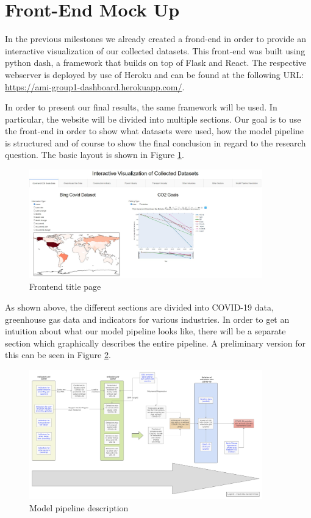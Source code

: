 \section{Front-End Mock Up}

In the previous milestones we already created a frond-end in order to provide an interactive visualization of our collected datasets. This front-end was built using python dash, a framework that builds on top of Flask and React. The respective webserver is deployed by use of Heroku and can be found at the following URL: \url{https://ami-group1-dashboard.herokuapp.com/}.

In order to present our final results, the same framework will be used. In particular, the website will be divided into multiple sections. Our goal is to use the front-end in order to show what datasets were used, how the model pipeline is structured and of course to show the final conclusion in regard to the research question. The basic layout is shown in Figure \ref{fig:front_end_title_page}.

\begin{figure}[h!]
\centering
\includegraphics[width=0.9\textwidth]{front_end_title_page}
\caption{Frontend title page}
\label{fig:front_end_title_page}
\end{figure}

As shown above, the different sections are divided into COVID-19 data, greenhouse gas data and indicators for various industries. In order to get an intuition about what our model pipeline looks like, there will be a separate section which graphically describes the entire pipeline. A preliminary version for this can be seen in Figure \ref{fig:model_pipeline}.

\begin{figure}[h!]
\centering
\includegraphics[width=0.9\textwidth]{mock-up_frontend_pipeline_description.pdf}
\caption{Model pipeline description}
\label{fig:model_pipeline}
\end{figure}


